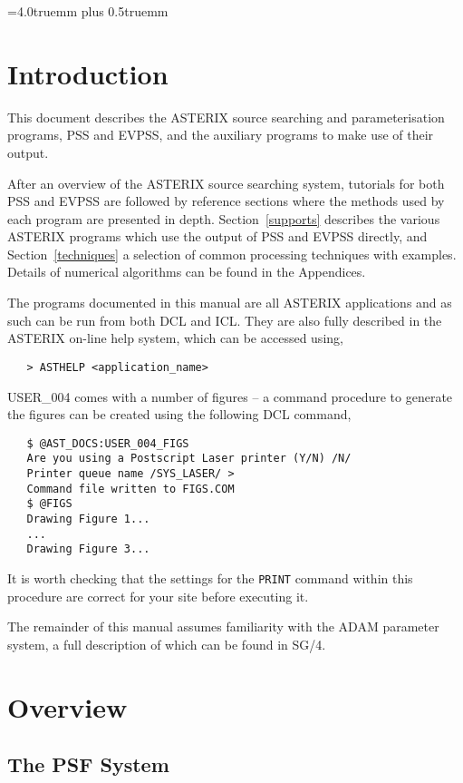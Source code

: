 \parskip=4.0truemm plus 0.5truemm       %

\tableofcontents

\newpage
\markright{\astdocname}

\section{Introduction}

This document describes the ASTERIX source searching and parameterisation
programs, PSS and EVPSS, and the auxiliary programs to make use of their
output. 

After an overview of the ASTERIX source searching system,
tutorials for both PSS and EVPSS are followed by reference sections where
the methods used by each program are presented in depth. Section~\ref{supports}
describes the various ASTERIX programs which use the output of PSS and EVPSS
directly, and Section~\ref{techniques} a selection of common processing
techniques with examples.
Details of numerical algorithms can be found in the Appendices.

The programs documented in this manual are all ASTERIX applications and
as such can be run from both DCL and ICL. They are also fully described in 
the ASTERIX on-line help system, which can be accessed using,
\begin{verbatim}
   > ASTHELP <application_name>
\end{verbatim}

USER\_004 comes with a number of figures -- a command procedure to 
generate the figures can be created using the following DCL command,
\begin{verbatim}
   $ @AST_DOCS:USER_004_FIGS 
   Are you using a Postscript Laser printer (Y/N) /N/ 
   Printer queue name /SYS_LASER/ > 
   Command file written to FIGS.COM
   $ @FIGS
   Drawing Figure 1...
   ...
   Drawing Figure 3...
\end{verbatim}
It is worth checking that the settings for
the \verb+PRINT+ command within this procedure are correct for your
site before executing it.

The remainder of this manual assumes familiarity with the ADAM parameter
system, a full description of which can be found in SG/4.

\newpage
\section{Overview}

\subsection{The PSF System}

